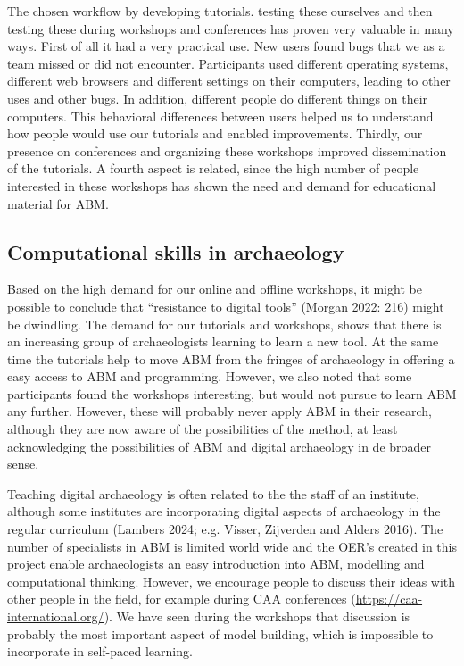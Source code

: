 \documentclass[
]{article}
\begin{document}
The chosen workflow by developing tutorials. testing these ourselves and then testing these during workshops and conferences has proven very valuable in many ways. First of all it had a very practical use. New users found bugs that we as a team missed or did not encounter. Participants used different operating systems, different web browsers and different settings on their computers, leading to other uses and other bugs. In addition, different people do different things on their computers. This behavioral differences between users helped us to understand how people would use our tutorials and enabled improvements. Thirdly, our presence on conferences and organizing these workshops improved dissemination of the tutorials. A fourth aspect is related, since the high number of people interested in these workshops has shown the need and demand for educational material for ABM.

\hypertarget{computational-skills-in-archaeology}{%
\subsection{Computational skills in archaeology}\label{computational-skills-in-archaeology}}

Based on the high demand for our online and offline workshops, it might be possible to conclude that ``resistance to digital tools'' (Morgan 2022: 216) might be dwindling. The demand for our tutorials and workshops, shows that there is an increasing group of archaeologists learning to learn a new tool. At the same time the tutorials help to move ABM from the fringes of archaeology in offering a easy access to ABM and programming. However, we also noted that some participants found the workshops interesting, but would not pursue to learn ABM any further. However, these will probably never apply ABM in their research, although they are now aware of the possibilities of the method, at least acknowledging the possibilities of ABM and digital archaeology in de broader sense.

Teaching digital archaeology is often related to the the staff of an institute, although some institutes are incorporating digital aspects of archaeology in the regular curriculum (Lambers 2024; e.g. Visser, Zijverden and Alders 2016). The number of specialists in ABM is limited world wide and the OER's created in this project enable archaeologists an easy introduction into ABM, modelling and computational thinking. However, we encourage people to discuss their ideas with other people in the field, for example during CAA conferences (\url{https://caa-international.org/}). We have seen during the workshops that discussion is probably the most important aspect of model building, which is impossible to incorporate in self-paced learning.
\end{document}
